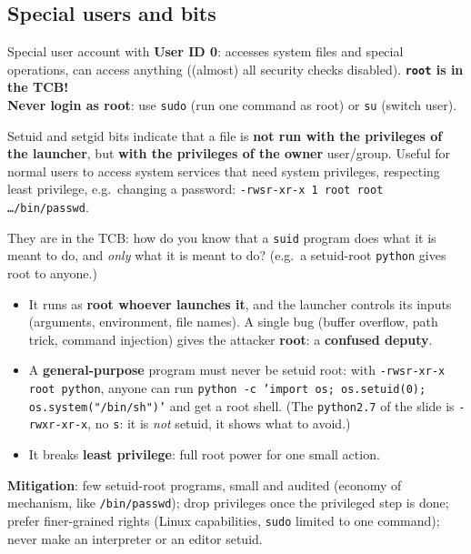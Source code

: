 \subsection{Special users and bits}

\begin{defnbox}[title=Super user (\texttt{root})]
Special user account with \textbf{User ID 0}: accesses system files and special
operations, can access anything ((almost) all security checks disabled).
\textbf{\texttt{root} is in the TCB!} \\
\textbf{Never login as root}: use \texttt{sudo} (run one command as root) or
\texttt{su} (switch user).
\end{defnbox}

\begin{defnbox}[title=\texttt{suid} / \texttt{sgid}]
Setuid and setgid bits indicate that a file is \textbf{not run with the privileges of
the launcher}, but \textbf{with the privileges of the owner} user/group. Useful for
normal users to access system services that need system privileges, respecting least
privilege, e.g.\ changing a password:
\texttt{-rwsr-xr-x 1 root root \ldots /bin/passwd}.
\end{defnbox}

\begin{warnbox}[title=Setuid root programs are dangerous]
They are in the TCB: how do you know that a \texttt{suid} program does what it is meant
to do, and \emph{only} what it is meant to do? (e.g.\ a setuid-root \texttt{python}
gives root to anyone.)
\end{warnbox}

\begin{exbox}[title=Why a setuid-root program is dangerous]
\begin{itemize}
  \item It runs as \textbf{root whoever launches it}, and the launcher controls its
        inputs (arguments, environment, file names). A single bug (buffer overflow, path
        trick, command injection) gives the attacker \textbf{root}: a
        \textbf{confused deputy}.
  \item A \textbf{general-purpose} program must never be setuid root: with
        \texttt{-rwsr-xr-x root python}, anyone can run
        \texttt{python -c 'import os; os.setuid(0); os.system("/bin/sh")'} and get a
        root shell. (The \texttt{python2.7} of the slide is \texttt{-rwxr-xr-x}, no
        \texttt{s}: it is \emph{not} setuid, it shows what to avoid.)
  \item It breaks \textbf{least privilege}: full root power for one small action.
\end{itemize}
\textbf{Mitigation}: few setuid-root programs, small and audited (economy of mechanism,
like \texttt{/bin/passwd}); drop privileges once the privileged step is done; prefer
finer-grained rights (Linux capabilities, \texttt{sudo} limited to one command); never
make an interpreter or an editor setuid.
\end{exbox}

